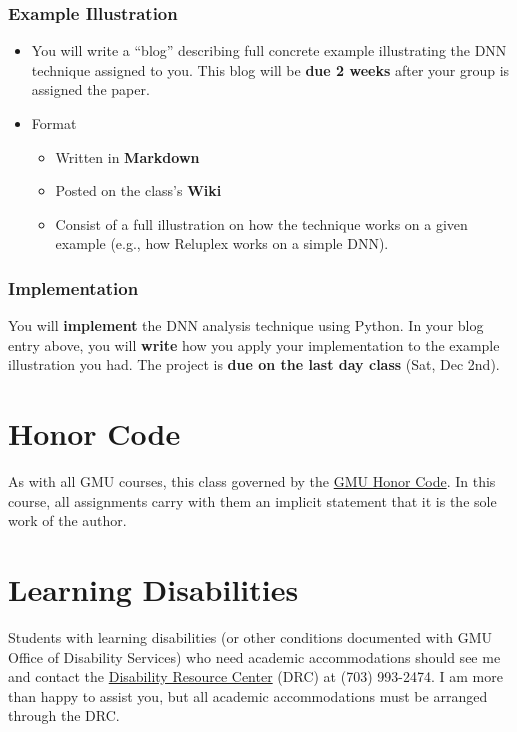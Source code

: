 \documentclass[11pt]{article}
\begin{document}
\subsubsection{Example Illustration}
\label{sec:orga9923fc}
\begin{itemize}
\item You will write a ``blog'' describing full concrete example illustrating the DNN technique assigned to you. This blog will be \textbf{due \textbf{2 weeks}} after your group is assigned the paper.

\item Format
\begin{itemize}
\item Written in \textbf{Markdown}
\item Posted on the class's \textbf{Wiki}
\item Consist of a full illustration on how the technique works on a given example (e.g., how Reluplex works on a simple DNN).  
\end{itemize}
\end{itemize}


\subsubsection{Implementation}
\label{sec:orgb697dba}

You will \textbf{implement} the DNN analysis technique using Python. In your blog entry above, you will \textbf{write}  how you apply your implementation to the example illustration you had. The project is \textbf{due on the last day class} (Sat, Dec 2nd).


\section{Honor Code}
\label{sec:orgf24f4c5}

As with all GMU courses, this class governed by the \href{http://oai.gmu.edu/the-mason-honor-code/}{GMU Honor Code}. In this course, all assignments carry with them an implicit statement that it is the sole work of the author.

\section{Learning Disabilities}
\label{sec:org28deb33}

Students with learning disabilities (or other conditions documented with GMU Office of Disability Services) who need academic accommodations should see me and contact the \href{http://ods.gmu.edu/}{Disability Resource Center} (DRC) at (703) 993-2474. I am more than happy to assist you, but all academic accommodations must be arranged through the DRC.
\end{document}
